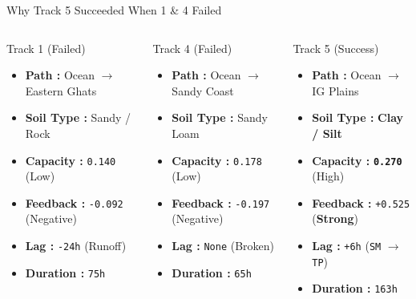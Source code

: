 \documentclass[8pt, aspectratio=169]{beamer}
\begin{document}
\begin{frame}{Why Track 5 Succeeded When 1 \& 4 Failed}
    \footnotesize
    \begin{columns}[T]
        \begin{block}{Track 1 (Failed)}
            \begin{itemize}\scriptsize
                \item \textbf{Path :} Ocean $\rightarrow$ Eastern Ghats
                \item \textbf{Soil Type :} Sandy / Rock
                \item \textbf{Capacity :} \texttt{0.140} (Low)
                \item \textbf{Feedback :} \texttt{-0.092} (Negative)
                \item \textbf{Lag :} \texttt{-24h} (Runoff)
                \item \textbf{Duration :} \texttt{75h}
            \end{itemize}
        \end{block}

        \begin{block}{Track 4 (Failed)}
            \begin{itemize}\scriptsize
                \item \textbf{Path :} Ocean $\rightarrow$ Sandy Coast
                \item \textbf{Soil Type :} Sandy Loam
                \item \textbf{Capacity :} \texttt{0.178} (Low)
                \item \textbf{Feedback :} \texttt{-0.197} (Negative)
                \item \textbf{Lag :} \texttt{None} (Broken)
                \item \textbf{Duration :} \texttt{65h}
            \end{itemize}
        \end{block}

        \begin{block}{Track 5 (Success)}
            \begin{itemize}\scriptsize
                \item \textbf{Path :} Ocean $\rightarrow$ IG Plains
                \item \textbf{Soil Type :} \textbf{Clay / Silt}
                \item \textbf{Capacity :} \textbf{\texttt{0.270}} (High)
                \item \textbf{Feedback :} \texttt{+0.525} (\textbf{Strong})
                \item \textbf{Lag :} \texttt{+6h} (\texttt{SM} $\rightarrow$ \texttt{TP})
                \item \textbf{Duration :} \texttt{163h}
            \end{itemize}
        \end{block}
    \end{columns}


\end{frame}
\end{document}
